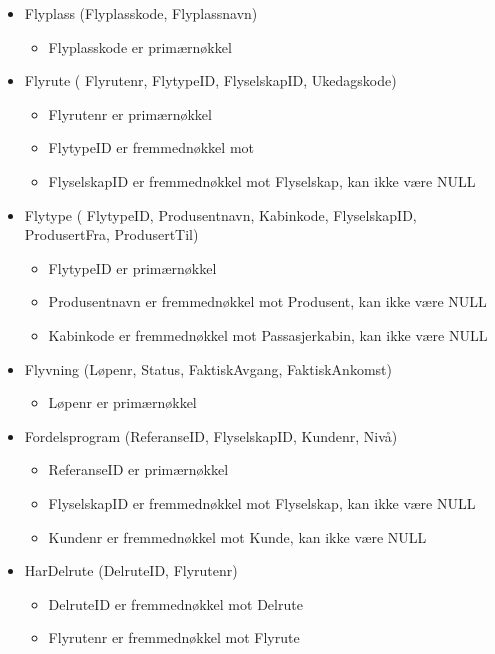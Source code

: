 \documentclass[a4paper,12pt]{article}
\begin{document}
\begin{itemize}
\item Flyplass (Flyplasskode, Flyplassnavn)
\begin{itemize}
\item Flyplasskode er primærnøkkel
\end{itemize}

\item Flyrute ( Flyrutenr, FlytypeID, FlyselskapID, Ukedagskode)
\begin{itemize}
\item Flyrutenr er primærnøkkel
\item FlytypeID er fremmednøkkel mot
\item FlyselskapID er fremmednøkkel mot Flyselskap, kan ikke være NULL
\end{itemize}

\item Flytype ( FlytypeID, Produsentnavn, Kabinkode, FlyselskapID, ProdusertFra, ProdusertTil)
\begin{itemize}
\item FlytypeID er primærnøkkel
\item Produsentnavn er fremmednøkkel mot Produsent, kan ikke være NULL
\item Kabinkode er fremmednøkkel mot Passasjerkabin, kan ikke være NULL
\end{itemize}

\item Flyvning (Løpenr, Status, FaktiskAvgang, FaktiskAnkomst)
\begin{itemize}
\item Løpenr er primærnøkkel
\end{itemize}

\item Fordelsprogram (ReferanseID, FlyselskapID, Kundenr, Nivå)
\begin{itemize}
\item ReferanseID er primærnøkkel
\item FlyselskapID er fremmednøkkel mot Flyselskap, kan ikke være NULL
\item Kundenr er fremmednøkkel mot Kunde, kan ikke være NULL
\end{itemize}

\item HarDelrute (DelruteID, Flyrutenr)
\begin{itemize}
\item DelruteID er fremmednøkkel mot Delrute
\item Flyrutenr er fremmednøkkel mot Flyrute
\end{itemize}


\end{itemize}
\end{document}
